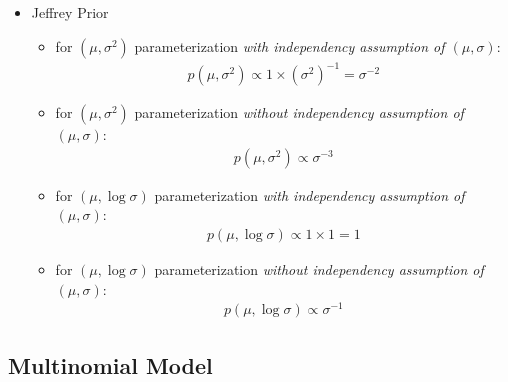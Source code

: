\begin{itemize}[topsep=2pt,itemsep=0pt]
    
    

    \item Jeffrey Prior
    \begin{itemize}[topsep=2pt,itemsep=0pt]
        \item for $ (\mu ,\sigma ^2) $ parameterization \textit{with independency assumption of $ (\mu ,\sigma  )$}:
    \begin{align}
        p(\mu ,\sigma ^2) \propto 1\times (\sigma ^2)^{-1}=\sigma ^{-2}
    \end{align}
        \item for $ (\mu ,\sigma ^2) $ parameterization \textit{without independency assumption of $ (\mu ,\sigma  )$}:
    \begin{align}
        p(\mu ,\sigma ^2) \propto \sigma ^{-3}
    \end{align}
        \item for $ (\mu ,\log \sigma ) $ parameterization \textit{with independency assumption of $ (\mu ,\sigma  )$}:
    \begin{align}
        p(\mu ,\log \sigma ) \propto 1\times 1 = 1
    \end{align}
        \item for $ (\mu ,\log \sigma ) $ parameterization \textit{without independency assumption of $ (\mu ,\sigma  )$}:
    \begin{align}
        p(\mu ,\log \sigma ) \propto \sigma ^{-1}
    \end{align}
        
        
    \end{itemize}
    
         

    
    
    
\end{itemize}

    









\subsection{Multinomial Model}\label{SubSubSectionBayesianMultinom}

